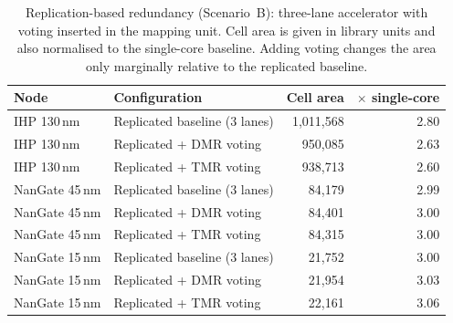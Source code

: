 \begin{table}[htbp]
\centering
\caption{Replication-based redundancy (Scenario~B): three-lane accelerator with voting inserted in the mapping unit. Cell area is given in library units and also normalised to the single-core baseline. Adding voting changes the area only marginally relative to the replicated baseline.}
\label{tab:replication}
\small
\begin{tabular}{llrr}
\toprule
Node & Configuration & Cell area & $\times$ single-core \\
\midrule
IHP 130\,nm & Replicated baseline (3 lanes) & 1,011,568 & 2.80 \\
IHP 130\,nm & Replicated + DMR voting & 950,085 & 2.63 \\
IHP 130\,nm & Replicated + TMR voting & 938,713 & 2.60 \\
\midrule
NanGate 45\,nm & Replicated baseline (3 lanes) & 84,179 & 2.99 \\
NanGate 45\,nm & Replicated + DMR voting & 84,401 & 3.00 \\
NanGate 45\,nm & Replicated + TMR voting & 84,315 & 3.00 \\
\midrule
NanGate 15\,nm & Replicated baseline (3 lanes) & 21,752 & 3.00 \\
NanGate 15\,nm & Replicated + DMR voting & 21,954 & 3.03 \\
NanGate 15\,nm & Replicated + TMR voting & 22,161 & 3.06 \\
\bottomrule
\end{tabular}
\end{table}
